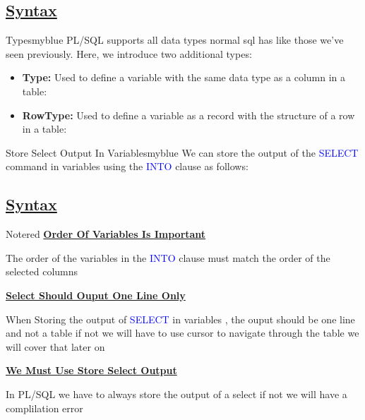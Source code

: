 \subsection*{\underline{Syntax}}



\vspace{0.25cm}
\begin{prettyBox}{Types}{myblue}
PL/SQL supports all data types normal sql has like those we've seen previously. Here, we introduce two additional types:

\begin{itemize}
    \item \textbf{Type:} Used to define a variable with the same data type as a column in a table:
    


    \item \textbf{RowType:} Used to define a variable as a record with the structure of a row in a table:

\end{itemize}

\end{prettyBox}



\begin{prettyBox}{Store Select Output In Variables}{myblue}
We can store the output of the \textcolor{blue}{SELECT} command in variables using the \textcolor{blue}{INTO} clause as follows:
\end{prettyBox}

\subsection*{\underline{Syntax}}



\vspace{0.25cm}

\begin{prettyBox}{Note}{red}
\textbf{\underline{Order Of Variables Is Important}}

\vspace{0.15cm}
The order of the variables in the \textcolor{blue}{INTO} clause must match the order of the selected columns

\vspace{0.25cm}
\textbf{\underline{Select Should Ouput One Line Only}}

\vspace{0.15cm}
When Storing the output of \textcolor{blue}{SELECT} in variables , the ouput should be one line and not a table
if not we will have to use cursor to navigate through the table we will cover that later on


\vspace{0.25cm}

\textbf{\underline{We Must Use Store Select Output}}

\vspace{0.15cm}
In PL/SQL we have to always store the output of a select if not we will have a complilation error
\end{prettyBox}

